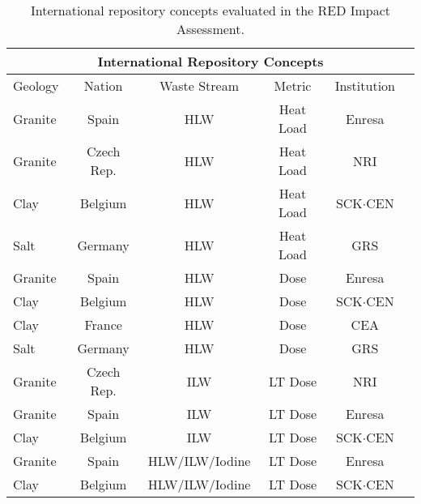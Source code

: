 
\begin{table}
  \centering
  \footnotesize{
  \begin{tabular}{|l|c|c|c|c|r|}
    \multicolumn{6}{c}{\textbf{International Repository Concepts}}\\
    \hline
    Geology     & Nation      & Waste Stream   & Metric    & Institution \\
    \hline 
    Granite     & Spain       & HLW            & Heat Load & Enresa  \\
    Granite     & Czech Rep.  & HLW            & Heat Load & NRI \\
    Clay        & Belgium     & HLW            & Heat Load & SCK$\cdot$CEN \\
    Salt        & Germany     & HLW            & Heat Load & GRS \\
    Granite     & Spain       & HLW            & Dose      & Enresa  \\
    Clay        & Belgium     & HLW            & Dose      & SCK$\cdot$CEN \\
    Clay        & France      & HLW            & Dose      & CEA \\
    Salt        & Germany     & HLW            & Dose      & GRS  \\
    Granite     & Czech Rep.  & ILW            & LT Dose   & NRI  \\
    Granite     & Spain       & ILW            & LT Dose   & Enresa  \\
    Clay        & Belgium     & ILW            & LT Dose   & SCK$\cdot$CEN  \\
    Granite     & Spain       & HLW/ILW/Iodine & LT Dose   & Enresa \\
    Clay        & Belgium     & HLW/ILW/Iodine & LT Dose   & SCK$\cdot$CEN \\
    \hline
  \end{tabular}
  \caption[International Repository Concepts]{International repository concepts evaluated in the RED Impact 
  Assessment.\cite{von_lensa_red-impact_2008}}
  \label{tab:red}
  }
\end{table}


